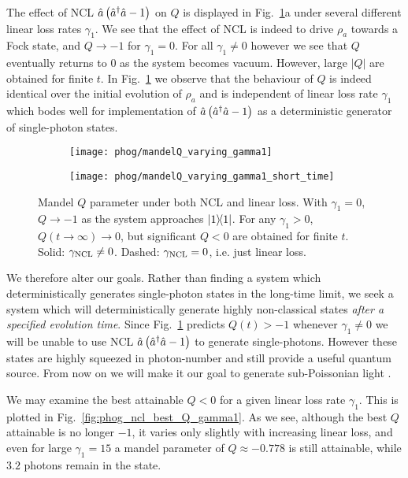 The effect of NCL $\hat{a}\left(\hat{a}^\dagger \hat{a} - 1\right)$ on $Q$ is displayed in Fig.~\ref{fig:phog_ncl_Q}a under several different linear loss rates $\gamma_1$. We see that the effect of NCL is indeed to drive $\rho_a$ towards a Fock state, and $Q \rightarrow -1$ for $\gamma_1 = 0$. For all $\gamma_1 \ne 0$ however we see that $Q$ eventually returns to $0$ as the system becomes vacuum. However, large $\left|Q\right|$ are obtained for finite $t$. In Fig.~\ref{fig:phog_ncl_Q} we observe that the behaviour of $Q$ is indeed identical over the initial evolution of $\rho_a$ and is independent of linear loss rate $\gamma_1$ which bodes well for implementation of $\hat{a}\left(\hat{a}^\dagger \hat{a} - 1\right)$ as a deterministic generator of single-photon states. 

\begin{figure}[htp]
\centering
	\begin{subfigure}{0.6\linewidth}
	\caption{}
	\texttt{[image: phog/mandelQ\_varying\_gamma1]}
	\end{subfigure}
	\begin{subfigure}{0.6\linewidth}
	\caption{}
	\texttt{[image: phog/mandelQ\_varying\_gamma1\_short\_time]}
	\end{subfigure}
\caption{\label{fig:phog_ncl_Q} Mandel $Q$ parameter under both NCL and linear loss. With $\gamma_1=0$, $Q \rightarrow -1$ as the system approaches $\dyad{1}$. For any $\gamma_1 > 0$, $Q\left(t\rightarrow\infty\right) \rightarrow 0$, but significant $Q < 0$ are obtained for finite $t$. Solid: $\gamma_{\text{NCL}} \ne 0$. Dashed: $\gamma_{\text{NCL}} = 0$, i.e. just linear loss.}
\end{figure}

We therefore alter our goals. Rather than finding a system which deterministically generates single-photon states in the long-time limit, we seek a system which will deterministically generate highly non-classical states \emph{after a specified evolution time}. Since Fig.~\ref{fig:phog_ncl_Q} predicts $Q\left(t\right) > -1$ whenever $\gamma_1 \ne 0$ we will be unable to use NCL $\hat{a}\left(\hat{a}^\dagger \hat{a} - 1\right)$ to generate single-photons. However these states are highly squeezed in photon-number and still provide a useful quantum source. From now on we will make it our goal to generate sub-Poissonian light .


We may examine the best attainable $Q<0$ for a given linear loss rate $\gamma_1$. This is plotted in Fig.~\ref{fig:phog_ncl_best_Q_gamma1}. As we see, although the best $Q$ attainable is no longer $-1$, it varies only slightly with increasing linear loss, and even for large $\gamma_1=15$ a mandel parameter of $Q \approx -0.778$ is still attainable, while $3.2$ photons remain in the state.

